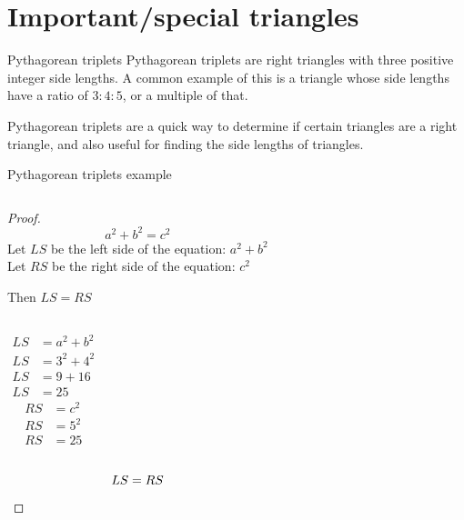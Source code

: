 	\section{Important/special triangles}
	\begin{namedframe}{Pythagorean triplets}
		Pythagorean triplets are right triangles with three positive integer side lengths. A common example of this is a triangle whose side lengths have a ratio of $3:4:5$, or a multiple of that.

		Pythagorean triplets are a quick way to determine if certain triangles are a right triangle, and also useful for finding the side lengths of triangles.
	\end{namedframe}
	\begin{namedframe}{Pythagorean triplets example}
		\begin{columns}[c]
				\centering
				\small
				\begin{proof}
					\vspace{-\baselineskip}
					\[a^2 + b^2 = c^2\]
					Let $LS$ be the left side of the equation: $a^2 + b^2$\\
					Let $RS$ be the right side of the equation: $c^2$

					Then $LS = RS$
					\begin{columns}[t]
							\begin{align*}
								LS &= a^2 + b^2\\
								LS &= 3^2 + 4^2\\
								LS &= 9 + 16\\
								LS &= 25
							\end{align*}
							\begin{align*}
								RS &= c^2\\
								RS &= 5^2\\
								RS &= 25
							\end{align*}
					\end{columns}
					\[LS = RS\qedhere\]
				\end{proof}
		\end{columns}
	\end{namedframe}
